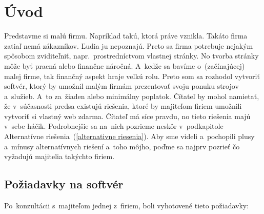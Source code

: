 \chapter*{Úvod}

Predstavme si malú firmu. Napríklad takú, ktorá práve vznikla. Takáto firma zatiaľ nemá zákazníkov. Ľudia ju nepoznajú. Preto sa firma potrebuje nejakým spôsobom zviditeľniť, napr.~prostredníctvom vlastnej stránky. No tvorba stránky môže byť pracná alebo finančne náročná. A~kedže sa bavíme o~(začínajúcej) malej firme, tak finančný aspekt hraje veľkú rolu. Preto som sa rozhodol vytvoriť softvér, ktorý by umožnil malým firmám prezentovať svoju ponuku strojov a~služieb. A~to za~žiaden alebo minimálny poplatok. Čítateľ by mohol namietať, že v~súčasnosti predsa existujú riešenia, ktoré by majiteľom firiem umožnili vytvoriť si vlastný web zdarma. Čítateľ má síce pravdu, no tieto riešenia majú v~sebe háčik. Podrobnejšie sa na~nich pozrieme neskôr v~podkapitole Alternatívne riešenia~(\ref{alternativne riesenia}). Aby sme videli a~pochopili plusy a~mínusy alternatívnych riešení a~toho môjho, poďme sa najprv pozrieť čo vyžadujú majitelia takýchto firiem.

\section{Požiadavky na softvér}
\label{poziadavky}

Po~konzultácii s~majiteľom jednej z~firiem, boli vyhotovené tieto požiadavky:

